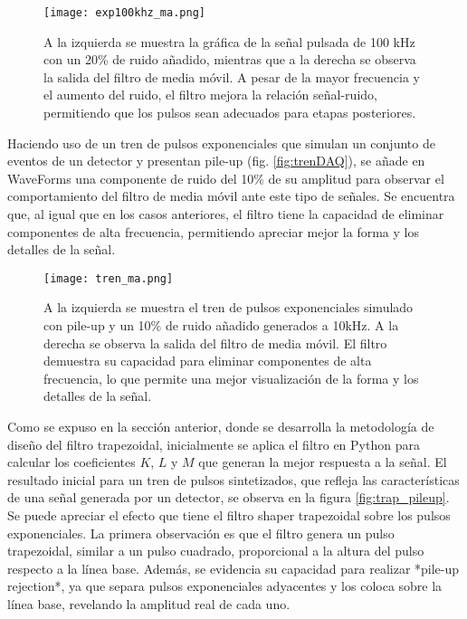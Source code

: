 \documentclass{report}
\begin{document}
\begin{figure}[H]
    \centering
    \texttt{[image: exp100khz\_ma.png]}
    \caption{A la izquierda se muestra la gráfica de la señal pulsada de 100 kHz con un 20\% de ruido añadido, mientras que a la derecha se observa la salida del filtro de media móvil. A pesar de la mayor frecuencia y el aumento del ruido, el filtro mejora la relación señal-ruido, permitiendo que los pulsos sean adecuados para etapas posteriores.}
    \label{fig:signal4MADAQ}
\end{figure}

\noindent Haciendo uso de un tren de pulsos exponenciales que simulan un conjunto de eventos de un detector y presentan pile-up (fig. \ref{fig:trenDAQ}), se añade en WaveForms una componente de ruido del 10\% de su amplitud para observar el comportamiento del filtro de media móvil ante este tipo de señales. Se encuentra que, al igual que en los casos anteriores, el filtro tiene la capacidad de eliminar componentes de alta frecuencia, permitiendo apreciar mejor la forma y los detalles de la señal.

\begin{figure}[H]
    \centering
    \texttt{[image: tren\_ma.png]}
    \caption{A la izquierda se muestra el tren de pulsos exponenciales simulado con pile-up y un 10\% de ruido añadido generados a 10kHz. A la derecha se observa la salida del filtro de media móvil. El filtro demuestra su capacidad para eliminar componentes de alta frecuencia, lo que permite una mejor visualización de la forma y los detalles de la señal.}
    \label{fig:trenMA}
\end{figure}

\noindent Como se expuso en la sección anterior, donde se desarrolla la metodología de diseño del filtro trapezoidal, inicialmente se aplica el filtro en Python para calcular los coeficientes \( K \), \( L \) y \( M \) que generan la mejor respuesta a la señal. El resultado inicial para un tren de pulsos sintetizados, que refleja las características de una señal generada por un detector, se observa en la figura \ref{fig:trap_pileup}.\\

\noindent Se puede apreciar el efecto que tiene el filtro shaper trapezoidal sobre los pulsos exponenciales. La primera observación es que el filtro genera un pulso trapezoidal, similar a un pulso cuadrado, proporcional a la altura del pulso respecto a la línea base. Además, se evidencia su capacidad para realizar *pile-up rejection*, ya que separa pulsos exponenciales adyacentes y los coloca sobre la línea base, revelando la amplitud real de cada uno.
\end{document}
